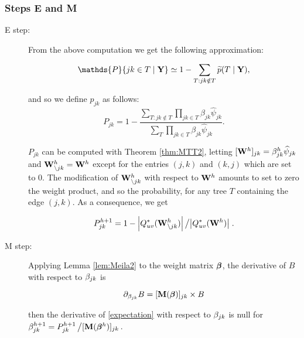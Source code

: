 \subsubsection*{Steps E and M}
\begin{description}
 \item[E step:]
From the above computation we get the following approximation:
 
 
$$\mathds{P}\{jk \in T  \mid \Yb\}\simeq 1 - \sum_{T:jk\notin T} \pt(T \mid \Yb),$$
 
and so we define $p_{jk}$ as follows:  
$$P_{jk}= 1 - \frac{\sum_{T:jk\notin T} \prod_{jk \in T} \beta_{jk} \widehat{\psi}_{jk}}{\sum_T \prod_{jk \in T} \beta_{jk} \widehat{\psi}_{jk}}.$$
 
 $P_{jk}$ can be computed with Theorem \ref{thm:MTT2}, letting $[{\bf W}^h]_{jk} = \beta^h_{jk} \widehat{\psi}_{jk}$ and ${\bf W}^h_{\setminus {jk}} = {\bf W}^h$ except for the entries $(j, k)$ and $(k, j)$ which are set to 0. The modification of ${\bf W}^h_{\setminus {jk}}$ with respect to ${\bf W}^h$ amounts to set to zero the weight product, and so the probability, for any tree $T$ containing the edge $(j, k)$. As a consequence, we get
 
$$
 P^{h+1}_{jk} = 1 - \left|Q_{uv}^*({\bf W}^h_{\setminus {jk}})\right| \left/ \left|Q_{uv}^*({\bf W}^h)\right| \right..
 $$
 
 \item[M step:] Applying Lemma \ref{lem:Meila2} to the weight matrix ${\boldsymbol{\beta}}$, the derivative of $B$ with respect to $\beta_{jk}$ is 
 
$$
 \partial_{\beta_{jk}} B = [{\bf M}({\boldsymbol{\beta}})]_{jk} \times B
 $$
 
 then the derivative of \eqref{expectation} with respect to $\beta_{jk}$ is null for
 $\beta^{h+1}_{jk} = P_{jk}^{h+1} \left/ [{\bf M}({\boldsymbol{\beta}}^h)]_{jk} \right.$.
 \end{description}
